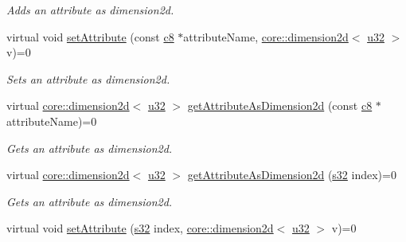 \begin{DoxyCompactItemize}
\begin{DoxyCompactList}\small\item\em Adds an attribute as dimension2d. \end{DoxyCompactList}\item 
\mbox{\label{classirr_1_1io_1_1IAttributes_aec6b634f9c8f9f1f986ab2f8e4e8ed3f}} 
virtual void \hyperlink{classirr_1_1io_1_1IAttributes_aec6b634f9c8f9f1f986ab2f8e4e8ed3f}{set\+Attribute} (const \hyperlink{namespaceirr_a9395eaea339bcb546b319e9c96bf7410}{c8} $\ast$attribute\+Name, \hyperlink{classirr_1_1core_1_1dimension2d}{core\+::dimension2d}$<$ \hyperlink{namespaceirr_a0416a53257075833e7002efd0a18e804}{u32} $>$ v)=0
\begin{DoxyCompactList}\small\item\em Sets an attribute as dimension2d. \end{DoxyCompactList}\item 
virtual \hyperlink{classirr_1_1core_1_1dimension2d}{core\+::dimension2d}$<$ \hyperlink{namespaceirr_a0416a53257075833e7002efd0a18e804}{u32} $>$ \hyperlink{classirr_1_1io_1_1IAttributes_a150afece0c99c98668a8f21247f2396f}{get\+Attribute\+As\+Dimension2d} (const \hyperlink{namespaceirr_a9395eaea339bcb546b319e9c96bf7410}{c8} $\ast$attribute\+Name)=0
\begin{DoxyCompactList}\small\item\em Gets an attribute as dimension2d. \end{DoxyCompactList}\item 
virtual \hyperlink{classirr_1_1core_1_1dimension2d}{core\+::dimension2d}$<$ \hyperlink{namespaceirr_a0416a53257075833e7002efd0a18e804}{u32} $>$ \hyperlink{classirr_1_1io_1_1IAttributes_a07f89c0d3670df87242cf8b82a8c7e3f}{get\+Attribute\+As\+Dimension2d} (\hyperlink{namespaceirr_ac66849b7a6ed16e30ebede579f9b47c6}{s32} index)=0
\begin{DoxyCompactList}\small\item\em Gets an attribute as dimension2d. \end{DoxyCompactList}\item 
\mbox{\label{classirr_1_1io_1_1IAttributes_ad2019a4dbefb6b45b80fe702fe99d3ae}} 
virtual void \hyperlink{classirr_1_1io_1_1IAttributes_ad2019a4dbefb6b45b80fe702fe99d3ae}{set\+Attribute} (\hyperlink{namespaceirr_ac66849b7a6ed16e30ebede579f9b47c6}{s32} index, \hyperlink{classirr_1_1core_1_1dimension2d}{core\+::dimension2d}$<$ \hyperlink{namespaceirr_a0416a53257075833e7002efd0a18e804}{u32} $>$ v)=0

\end{DoxyCompactItemize}
